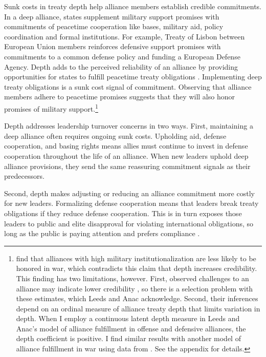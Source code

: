 \documentclass[12pt]{article}
\begin{document}
Sunk costs in treaty depth help alliance members establish credible commitments.
In a deep alliance, states supplement military support promises with commitments of peacetime cooperation like bases, military aid, policy coordination and formal institutions. 
For example, Treaty of Lisbon between European Union members reinforces defensive support promises with commitments to a common defense policy and funding a European Defense Agency. 
Depth adds to the perceived reliability of an alliance by providing opportunities for states to fulfill peacetime treaty obligations \citep{Morrow1994}. 
Implementing deep treaty obligations is a sunk cost signal of commitment.
Observing that alliance members adhere to peacetime promises suggests that they will also honor promises of military support.\footnote{\citet{LeedsAnac2005} find that alliances with high military institutionalization are less likely to be honored in war, which contradicts this claim that depth increases credibility. 
This finding has two limitations, however. 
First, observed challenges to an alliance may indicate lower credibility \citep{Smith1995}, so there is a selection problem with these estimates, which Leeds and Anac acknowledge. 
Second, their inferences depend on an ordinal measure of alliance treaty depth that limits variation in depth. 
When I employ a continuous latent depth measure in Leeds and Anac's model of alliance fulfillment in offense and defensive alliances, the depth coefficient is positive. 
I find similar results with another model of alliance fulfillment in war using data from \citet{BerkemeierFuhrmann2018}.
See the appendix for details.} 


Depth addresses leadership turnover concerns in two ways. 
First, maintaining a deep alliance often requires ongoing sunk costs.
Upholding aid, defense cooperation, and basing rights means allies must continue to invest in defense cooperation throughout the life of an alliance. 
When new leaders uphold deep alliance provisions, they send the same reassuring commitment signals as their predecessors. 


Second, depth makes adjusting or reducing an alliance commitment more costly for new leaders. 
Formalizing defense cooperation means that leaders break treaty obligations if they reduce defense cooperation. 
This is in turn exposes those leaders to public and elite disapproval for violating international obligations, so long as the public is paying attention \citep{Slantchev2006, PotterBaum2014} and prefers compliance \citep{Chaudoin2014, KertzerBrutger2016}.
\end{document}
